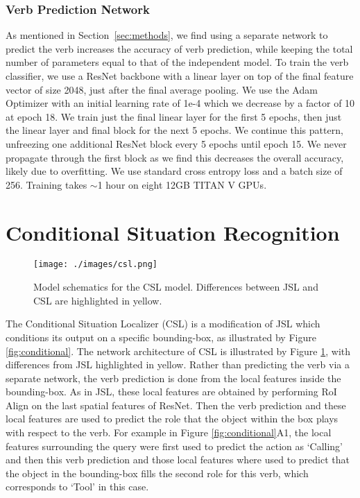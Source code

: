 \documentclass[runningheads]{llncs}
\begin{document}
\subsubsection{Verb Prediction Network}
As mentioned in Section~\ref{sec:methods}, we find using a separate network to predict the verb increases the accuracy of verb prediction, while keeping the total number of parameters equal to that of the independent model. To train the verb classifier, we use a ResNet backbone with a linear layer on top of the final feature vector of size 2048, just after the final average pooling. We use the Adam Optimizer with an initial learning rate of 1e-4 which we decrease by a factor of 10 at epoch 18. We train just the final linear layer for the first 5 epochs, then just the linear layer and final block for the next 5 epochs. We continue this pattern, unfreezing one additional ResNet block every 5 epochs until epoch 15. We never propagate through the first block as we find this decreases the overall accuracy, likely due to overfitting. We use standard cross entropy loss and a batch size of 256. Training takes $\sim$1 hour on eight 12GB TITAN V GPUs. 
 \section{Conditional Situation Recognition}
\label{sec:csl}


\begin{figure}
\centering
\texttt{[image: ./images/csl.png]}
\caption{Model schematics for the CSL model. Differences between JSL and CSL are highlighted in yellow.
}

\label{fig:csl}
\end{figure}


The Conditional Situation Localizer (CSL) is a modification of JSL which conditions its output on a specific bounding-box, as illustrated by Figure \ref{fig:conditional}. The network architecture of CSL is illustrated by Figure \ref{fig:csl}, with differences from JSL highlighted in yellow. Rather than predicting the verb via a separate network, the verb prediction is done from the local features inside the bounding-box. As in JSL, these local features are obtained by performing RoI Align on the last spatial features of ResNet. Then the verb prediction and these local features are used to predict the role that the object within the box plays with respect to the verb. For example in Figure \ref{fig:conditional}A1, the local features surrounding the query were first used to predict the action as `Calling' and then this verb prediction and those local features where used to predict that the object in the bounding-box fills the second role for this verb, which corresponds to `Tool' in this case. 
\end{document}
